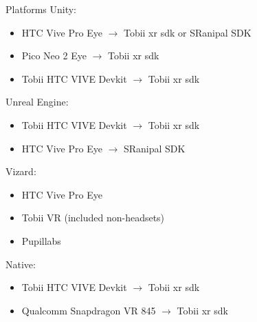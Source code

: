 \documentclass{beamer}
\begin{document}
\begin{frame}{Platforms}
	Unity:
	\begin{itemize}
		\item HTC Vive Pro Eye $\rightarrow$ Tobii xr sdk or SRanipal SDK
		\item Pico Neo 2 Eye $\rightarrow$ Tobii xr sdk
		\item Tobii HTC VIVE Devkit $\rightarrow$ Tobii xr sdk
	\end{itemize}

	Unreal Engine:
	\begin{itemize}
		\item Tobii HTC VIVE Devkit $\rightarrow$ Tobii xr sdk
		\item HTC Vive Pro Eye $\rightarrow$ SRanipal SDK
	\end{itemize}

	Vizard:
	\begin{itemize}
		\item HTC Vive Pro Eye
		\item Tobii VR (included non-headsets)
		\item Pupillabs
	\end{itemize}

	Native:
	\begin{itemize}
		\item Tobii HTC VIVE Devkit $\rightarrow$ Tobii xr sdk
		\item Qualcomm Snapdragon VR 845 $\rightarrow$ Tobii xr sdk
	\end{itemize}
	

\end{frame}


\end{document}
